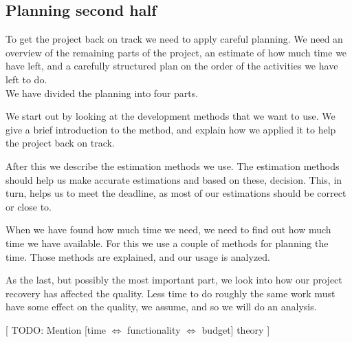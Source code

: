 \subsection{Planning second half}
To get the project back on track we need to apply careful planning. We need an overview of the remaining parts of the project, an estimate of how much time we have left, and a carefully structured plan on the order of the activities we have left to do.\\
We have divided the planning into four parts.

We start out by looking at the development methods that we want to use. We give a brief introduction to the method, and explain how we applied it to help the project back on track.

After this we describe the estimation methods we use. The estimation methods should help us make accurate estimations and based on these, decision. This, in turn, helps us to meet the deadline, as most of our estimations should be correct or close to.

When we have found how much time we need, we need to find out how much time we have available. For this we use a couple of methods for planning the time. Those methods are explained, and our usage is analyzed.

As the last, but possibly the most important part, we look into how our project recovery has affected the quality. Less time to do roughly the same work must have some effect on the quality, we assume, and so we will do an analysis.

[ TODO: Mention [time $\Leftrightarrow$ functionality $\Leftrightarrow$ budget] theory ]